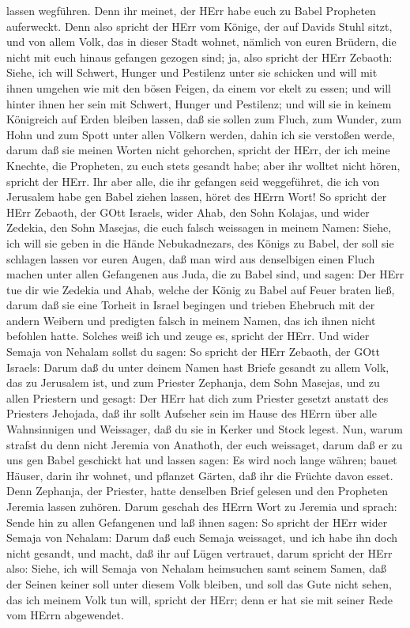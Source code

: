lassen wegführen.  Denn ihr meinet, der HErr habe euch zu
Babel Propheten auferweckt.  Denn also spricht der HErr vom
Könige, der auf Davids Stuhl sitzt, und von allem Volk, das in dieser
Stadt wohnet, nämlich von euren Brüdern, die nicht mit euch hinaus
gefangen gezogen sind;  ja, also spricht der HErr Zebaoth:
Siehe, ich will Schwert, Hunger und Pestilenz unter sie schicken und
will mit ihnen umgehen wie mit den bösen Feigen, da einem vor ekelt zu
essen;  und will hinter ihnen her sein mit Schwert, Hunger
und Pestilenz; und will sie in keinem Königreich auf Erden bleiben
lassen, daß sie sollen zum Fluch, zum Wunder, zum Hohn und zum Spott
unter allen Völkern werden, dahin ich sie verstoßen werde, 
darum daß sie meinen Worten nicht gehorchen, spricht der HErr, der ich
meine Knechte, die Propheten, zu euch stets gesandt habe; aber ihr
wolltet nicht hören, spricht der HErr.  Ihr aber alle, die
ihr gefangen seid weggeführet, die ich von Jerusalem habe gen Babel
ziehen lassen, höret des HErrn Wort!  So spricht der HErr
Zebaoth, der GOtt Israels, wider Ahab, den Sohn Kolajas, und wider
Zedekia, den Sohn Masejas, die euch falsch weissagen in meinem Namen:
Siehe, ich will sie geben in die Hände Nebukadnezars, des Königs zu
Babel, der soll sie schlagen lassen vor euren Augen,  daß
man wird aus denselbigen einen Fluch machen unter allen Gefangenen aus
Juda, die zu Babel sind, und sagen: Der HErr tue dir wie Zedekia und
Ahab, welche der König zu Babel auf Feuer braten ließ, 
darum daß sie eine Torheit in Israel begingen und trieben Ehebruch mit
der andern Weibern und predigten falsch in meinem Namen, das ich ihnen
nicht befohlen hatte. Solches weiß ich und zeuge es, spricht der HErr.
 Und wider Semaja von Nehalam sollst du sagen:
 So spricht der HErr Zebaoth, der GOtt Israels: Darum daß
du unter deinem Namen hast Briefe gesandt zu allem Volk, das zu
Jerusalem ist, und zum Priester Zephanja, dem Sohn Masejas, und zu allen
Priestern und gesagt:  Der HErr hat dich zum Priester
gesetzt anstatt des Priesters Jehojada, daß ihr sollt Aufseher sein im
Hause des HErrn über alle Wahnsinnigen und Weissager, daß du sie in
Kerker und Stock legest.  Nun, warum strafst du denn nicht
Jeremia von Anathoth, der euch weissaget,  darum daß er zu
uns gen Babel geschickt hat und lassen sagen: Es wird noch lange währen;
bauet Häuser, darin ihr wohnet, und pflanzet Gärten, daß ihr die Früchte
davon esset.  Denn Zephanja, der Priester, hatte denselben
Brief gelesen und den Propheten Jeremia lassen zuhören. 
Darum geschah des HErrn Wort zu Jeremia und sprach:  Sende
hin zu allen Gefangenen und laß ihnen sagen: So spricht der HErr wider
Semaja von Nehalam: Darum daß euch Semaja weissaget, und ich habe ihn
doch nicht gesandt, und macht, daß ihr auf Lügen vertrauet,
 darum spricht der HErr also: Siehe, ich will Semaja von
Nehalam heimsuchen samt seinem Samen, daß der Seinen keiner soll unter
diesem Volk bleiben, und soll das Gute nicht sehen, das ich meinem Volk
tun will, spricht der HErr; denn er hat sie mit seiner Rede vom HErrn
abgewendet.

